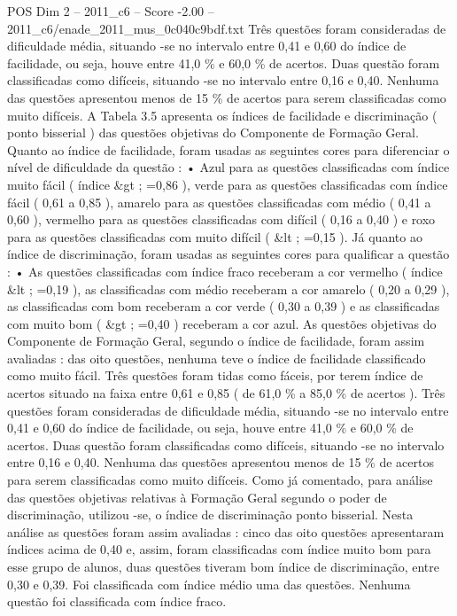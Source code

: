 \begin{textsample}{POS Dim 2 – 2011\_c6 – Score -2.00 – 2011\_c6/enade\_2011\_mus\_0c040c9bdf.txt}
Três questões foram consideradas de dificuldade média, situando -se no intervalo entre 0,41 e 0,60 do índice de facilidade, ou seja, houve entre 41,0 \% e 60,0 \% de acertos.
Duas questão foram classificadas como difíceis, situando -se no intervalo entre 0,16 e 0,40.
Nenhuma das questões apresentou menos de 15 \% de acertos para serem classificadas como muito difíceis.
A Tabela 3.5 apresenta os índices de facilidade e discriminação ( ponto bisserial ) das questões objetivas do Componente de Formação Geral.
Quanto ao índice de facilidade, foram usadas as seguintes cores para diferenciar o nível de dificuldade da questão : • Azul para as questões classificadas com índice muito fácil ( índice \&gt ; =0,86 ), verde para as questões classificadas com índice fácil ( 0,61 a 0,85 ), amarelo para as questões classificadas com médio ( 0,41 a 0,60 ), vermelho para as questões classificadas com difícil ( 0,16 a 0,40 ) e roxo para as questões classificadas com muito difícil ( \&lt ; =0,15 ).
Já quanto ao índice de discriminação, foram usadas as seguintes cores para qualificar a questão : • As questões classificadas com índice fraco receberam a cor vermelho ( índice \&lt ; =0,19 ), as classificadas com médio receberam a cor amarelo ( 0,20 a 0,29 ), as classificadas com bom receberam a cor verde ( 0,30 a 0,39 ) e as classificadas com muito bom ( \&gt ; =0,40 ) receberam a cor azul.
As questões objetivas do Componente de Formação Geral, segundo o índice de facilidade, foram assim avaliadas : das oito questões, nenhuma teve o índice de facilidade classificado como muito fácil.
Três questões foram tidas como fáceis, por terem índice de acertos situado na faixa entre 0,61 e 0,85 ( de 61,0 \% a 85,0 \% de acertos ).
Três questões foram consideradas de dificuldade média, situando -se no intervalo entre 0,41 e 0,60 do índice de facilidade, ou seja, houve entre 41,0 \% e 60,0 \% de acertos.
Duas questão foram classificadas como difíceis, situando -se no intervalo entre 0,16 e 0,40.
Nenhuma das questões apresentou menos de 15 \% de acertos para serem classificadas como muito difíceis.
Como já comentado, para análise das questões objetivas relativas à Formação Geral segundo o poder de discriminação, utilizou -se, o índice de discriminação ponto bisserial.
Nesta análise as questões foram assim avaliadas : cinco das oito questões apresentaram índices acima de 0,40 e, assim, foram classificadas com índice muito bom para esse grupo de alunos, duas questões tiveram bom índice de discriminação, entre 0,30 e 0,39.
Foi classificada com índice médio uma das questões.
Nenhuma questão foi classificada com índice fraco.

\end{textsample}

